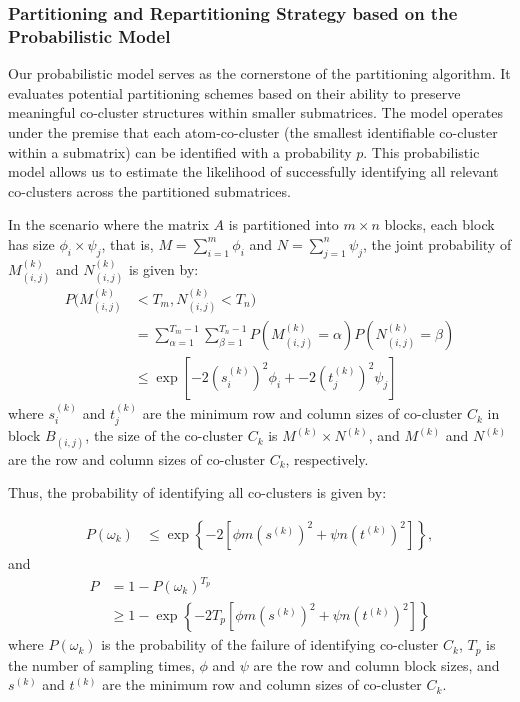 \documentclass[journal]{IEEEtran}
\begin{document}
\subsubsection{Partitioning and Repartitioning Strategy based on the Probabilistic Model}

Our probabilistic model serves as the cornerstone of the partitioning algorithm. It evaluates potential partitioning schemes based on their ability to preserve meaningful co-cluster structures within smaller submatrices. The model operates under the premise that each atom-co-cluster (the smallest identifiable co-cluster within a submatrix) can be identified with a probability $p$. This probabilistic model allows us to estimate the likelihood of successfully identifying all relevant co-clusters across the partitioned submatrices.

In the scenario where the matrix $A$ is partitioned into $m \times n$ blocks, each block has size $\phi_i \times \psi_j$, that is, $M=\sum_{i=1}^m \phi_i$ and $N=\sum_{j=1}^n \psi_j$, the joint probability of $M_{(i,j)}^{(k)}$ and $N_{(i,j)}^{(k)}$ is given by:
\begin{align*}
  P(M_{(i,j)}^{(k)} & < T_m, N_{(i,j)}^{(k)} < T_n)                                                                           \\
                    & = \sum_{\alpha=1}^{T_m-1} \sum_{\beta=1}^{T_n-1} P(M_{(i,j)}^{(k)} = \alpha) P(N_{(i,j)}^{(k)} = \beta) \\
                    & \le \exp[-2 (s_i^{(k)})^2 \phi_i + -2 (t_j^{(k)})^2 \psi_j]
\end{align*}
where $s_i^{(k)}$ and $t_j^{(k)}$ are the minimum row and column sizes of co-cluster $C_k$ in block $B_{(i,j)}$, the size of the co-cluster $C_k$ is $M^{(k)} \times N^{(k)}$, and $M^{(k)}$ and $N^{(k)}$ are the row and column sizes of co-cluster $C_k$, respectively.

Thus, the probability of identifying all co-clusters is given by:

\begin{align}
  P(\omega_k) & \le \exp \left\{ -2 [\phi m (s^{(k)})^2 + \psi n (t^{(k)})^2] \right\},
\end{align}
and
\begin{align}
  P & = 1 - P(\omega_k)^{T_p}                                                                                                       \\
    & \ge 1 - \exp \left\{ -2 T_p [\phi m (s^{(k)})^2 + \psi n (t^{(k)})^2] \right\} \label{eq:prob_of_identifying_all_co_clusters}
\end{align}
where $P(\omega_k)$ is the probability of the failure of identifying co-cluster $C_k$, $T_p$ is the number of sampling times, $\phi$ and $\psi$ are the row and column block sizes, and $s^{(k)}$ and $t^{(k)}$ are the minimum row and column sizes of co-cluster $C_k$.
\end{document}
